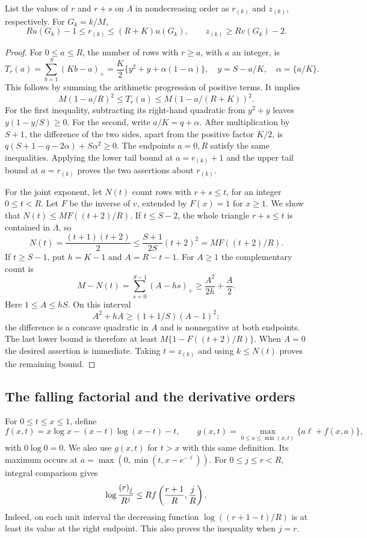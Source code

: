 \begin{lemma}\label{lem:radial-quantiles}
List the values of $r$ and $r+s$ on $\Lambda$ in nondecreasing order as
$r_{(k)}$ and $z_{(k)}$, respectively. For $G_k=k/M$,
\[
 Ru(G_k)-1\leq r_{(k)}\leq(R+K)u(G_k),\qquad
 z_{(k)}\geq Rv(G_k)-2.
\]
\end{lemma}
\begin{proof}
For $0\leq a\leq R$, the number of rows with $r\geq a$, with $a$ an
integer, is
\[
 T_r(a)=\sum_{b=1}^S(Kb-a)_+
       =\frac K2\{y^2+y+\alpha(1-\alpha)\},
 \quad y=S-a/K,\quad\alpha=\{a/K\}.
\]
This follows by summing the arithmetic progression of positive terms.
It implies
\[
 M(1-a/R)^2\leq T_r(a)
       \leq M(1-a/(R+K))^2.
\]
For the first inequality, subtracting its right-hand quadratic from
$y^2+y$ leaves $y(1-y/S)\geq0$.
For the second, write $a/K=q+\alpha$. After multiplication by $S+1$,
the difference of the two sides, apart from the positive factor $K/2$,
is $q(S+1-q-2\alpha)+S\alpha^2\geq0$.
The endpoints $a=0,R$ satisfy the same inequalities.
Applying the lower tail bound at $a=r_{(k)}+1$ and the upper tail bound
at $a=r_{(k)}$ proves the two assertions about $r_{(k)}$.

For the joint exponent, let $N(t)$ count rows with $r+s\leq t$, for an
integer $0\leq t<R$. Let $F$ be the inverse of $v$, extended by $F(x)=1$
for $x\geq1$. We show that $N(t)\leq MF((t+2)/R)$.
If $t\leq S-2$, the whole triangle $r+s\leq t$ is contained in
$\Lambda$, so
\[
 N(t)=\frac{(t+1)(t+2)}2
       \leq\frac{S+1}{2S}(t+2)^2=MF((t+2)/R).
\]
If $t\geq S-1$, put $h=K-1$ and $A=R-t-1$.
For $A\geq1$ the complementary count is
\[
 M-N(t)=\sum_{s=0}^{S-1}(A-hs)_+
       \geq\frac{A^2}{2h}+\frac A2.
\]
Here $1\leq A\leq hS$. On this interval
\[
 A^2+hA\geq(1+1/S)(A-1)^2:
\]
the difference is a concave quadratic in $A$ and is nonnegative at both
endpoints. The last lower bound is therefore at least
$M\{1-F((t+2)/R)\}$. When $A=0$ the desired assertion is immediate.
Taking $t=z_{(k)}$ and using $k\leq N(t)$ proves the remaining bound.
\end{proof}

\subsection{The falling factorial and the derivative orders}
For $0\leq t\leq x\leq1$, define
\[
 f(x,t)=x\log x-(x-t)\log(x-t)-t,
 \qquad
 g(x,t)=\max_{0\leq a\leq\min(x,t)}\{a\ell+f(x,a)\},
\]
with $0\log0=0$. We also use $g(x,t)$ for $t>x$ with this same
definition. Its maximum occurs at
$a=\max(0,\min(t,x-e^{-\ell}))$.
For $0\leq j\leq r<R$, integral comparison gives
\begin{equation}\label{eq:radial-factorial}
 \log\frac{(r)_{\underline{j}}}{R^j}
 \leq Rf\left(\frac{r+1}{R},\frac jR\right).
\end{equation}
Indeed, on each unit interval the decreasing function
$\log((r+1-t)/R)$ is at least its value at the right endpoint.
This also proves the inequality when $j=r$.


